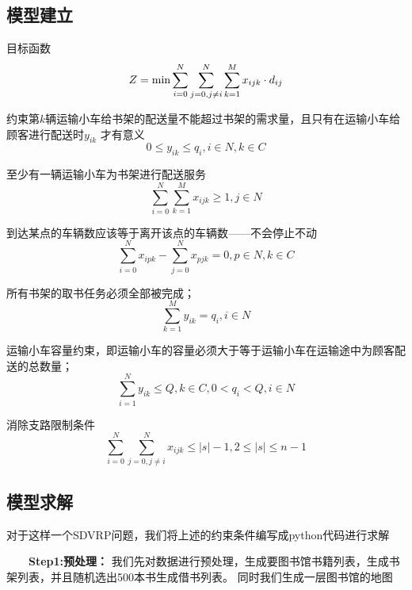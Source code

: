 \documentclass[withoutpreface,bwprint]{thesis-config}
\begin{document}
\subsection{模型建立}
\par 目标函数 
\begin{equation}
    Z=\operatorname*{min}\sum_{i=0}^{N}\sum_{j=0,j\neq i}^{N}\sum_{k=1}^{M}x_{ijk}\cdot d_{ij}\\
\end{equation}
\par 约束第$k$辆运输小车给书架的配送量不能超过书架的需求量，且只有在运输小车给顾客进行配送时$y_{ik}$ 才有意义
\begin{equation}
   0\leq y_{ik}\leq q_{i}, i\in N, k\in C    
\end{equation}
\par 至少有一辆运输小车为书架进行配送服务
\begin{equation}
    \sum_{i=0}^{N}\sum_{k=1}^{M}x_{ijk}\geq1, j\in N
\end{equation}
\par 到达某点的车辆数应该等于离开该点的车辆数——不会停止不动
\begin{equation}
    \sum_{i=0}^{N}x_{ipk}-\sum_{j=0}^{N}x_{pjk}=0, p\in N, k\in C
\end{equation}
\par 所有书架的取书任务必须全部被完成；
\begin{equation}
   \sum_{k=1}^{M}y_{ik}=q_{i}, i\in N 
\end{equation}
\par 运输小车容量约束，即运输小车的容量必须大于等于运输小车在运输途中为顾客配送的总数量；
\begin{equation}
    \sum_{i=1}^{N}y_{ik}\leq Q, k\in C,0<q_{i}<Q, i\in N
\end{equation}
\par 消除支路限制条件
\begin{equation}
    \sum_{i=0}^{N}\sum_{j=0,j\neq i}^{N}x_{ijk}\leq|s|-1, 2\leq|s|\leq n-1
\end{equation}

\subsection{模型求解}
\par 对于这样一个SDVRP问题，我们将上述的约束条件编写成python代码进行求解

\par \quad ~~~~\textbf{Step1:预处理：} 
我们先对数据进行预处理，生成要图书馆书籍列表，生成书架列表，并且随机选出500本书生成借书列表。
同时我们生成一层图书馆的地图
\end{document}
